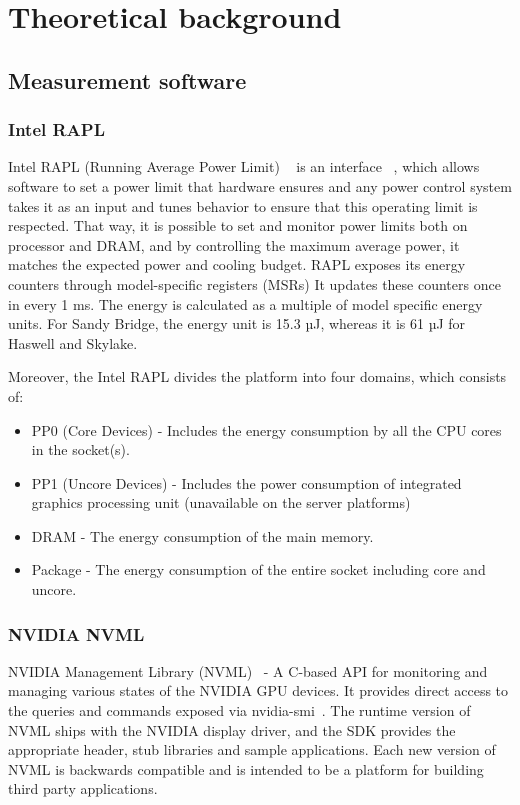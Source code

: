 \chapter{Theoretical background}

\section{Measurement software}

\subsection{Intel RAPL}

Intel RAPL (Running Average Power Limit)
~\cite{Power_Management_on_Intel_Microprocessor} is an interface
~\cite{RAPL_Power_Estimation_and_Capping}, which allows
software to set a power limit that hardware ensures and any
power control system takes it as an input and tunes behavior
to ensure that this operating limit is respected.
That way, it is possible to set and monitor power limits both
on processor and DRAM, and by controlling the maximum average
power, it matches the expected power and cooling budget. RAPL
exposes its energy counters through model-specific registers
(MSRs) It updates these counters once in every 1 ms. The energy
is calculated as a multiple of model specific energy units.
For Sandy Bridge, the energy unit is 15.3 µJ, whereas it is 61
µJ for Haswell and Skylake.

Moreover, the Intel RAPL divides the platform into four domains,
which consists of:

\begin{itemize}
    \item PP0 (Core Devices) - Includes the energy consumption
    by all the CPU cores in the socket(s).
    \item PP1 (Uncore Devices) - Includes the power consumption
    of integrated graphics processing unit (unavailable on the
    server platforms)
    \item DRAM - The energy consumption of the main memory.
    \item Package - The energy consumption of the entire socket
    including core and uncore.
\end{itemize}

\subsection{NVIDIA NVML}

NVIDIA Management Library (NVML)~\cite{NVML} - A C-based API
for monitoring and managing various states of the NVIDIA GPU
devices. It provides direct access to the queries and commands
exposed via nvidia-smi~\cite{NVIDIA_SMI}.
The runtime version of NVML ships
with the NVIDIA display driver, and the SDK provides the
appropriate header, stub libraries and sample applications.
Each new version of NVML is backwards compatible and is intended
to be a platform for building third party applications.

